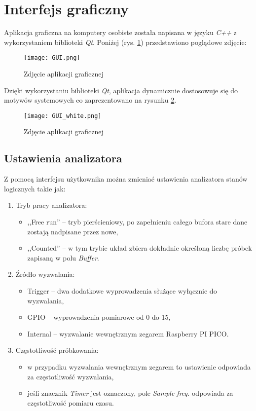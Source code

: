 \section{Interfejs graficzny}
    Aplikacja graficzna na komputery osobiste została napisana w języku \textit{C++} z wykorzystaniem biblioteki \textit{Qt}.
    Poniżej (rys. \ref{fig:gui}) przedstawiono poglądowe zdjęcie:

    \begin{figure}[!ht]
        \centering
        \texttt{[image: GUI.png]}
        \caption{Zdjęcie aplikacji graficznej}
        \label{fig:gui}
    \end{figure}

    Dzięki wykorzystaniu biblioteki \textit{Qt}, aplikacja dynamicznie dostosowuje się do motywów systemowych co zaprezentowano na rysunku \ref{fig:gui_white}.
    \begin{figure}[!ht]
        \centering
        \texttt{[image: GUI\_white.png]}
        \caption{Zdjęcie aplikacji graficznej}
        \label{fig:gui_white}
    \end{figure}


    \subsection{Ustawienia analizatora}
        Z pomocą interfejsu użytkownika można zmieniać ustawienia analizatora stanów logicznych takie jak:
        \begin{enumerate}
            \item Tryb pracy analizatora:
            \begin{itemize}
                \item ,,Free run'' -- tryb pierścieniowy, po zapełnieniu całego bufora stare dane zostają nadpisane przez nowe,
                \item ,,Counted''  -- w tym trybie układ zbiera dokładnie określoną liczbę próbek zapisaną w polu \textit{Buffer}.
            \end{itemize}
            \item Źródło wyzwalania:
            \begin{itemize}
                \item Trigger   -- dwa dodatkowe wyprowadzenia służące wyłącznie do wyzwalania,
                \item GPIO      -- wyprowadzenia pomiarowe od 0 do 15,
                \item Internal  -- wyzwalanie wewnętrznym zegarem Raspberry PI PICO.
            \end{itemize}
            \item Częstotliwość próbkowania:
            \begin{itemize}
                \item w przypadku wyzwalania wewnętrznym zegarem to ustawienie odpowiada za częstotliwość wyzwalania,
                \item jeśli znacznik \textit{Timer} jest oznaczony, pole \textit{Sample freq.} odpowiada za częstotliwość pomiaru czasu.
            \end{itemize}
        \end{enumerate}

